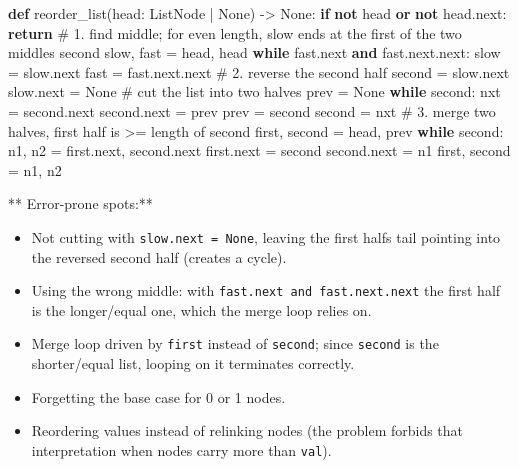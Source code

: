 \documentclass[11pt]{article}
\providecommand{\tightlist}{\setlength{\itemsep}{1pt}\setlength{\parskip}{0pt}}
\newenvironment{Shaded}{\begin{snugshade}}{\end{snugshade}}
\newcommand{\BuiltInTok}[1]{\textcolor[rgb]{0.50,0.55,0.55}{#1}}
\newcommand{\CommentTok}[1]{\textcolor[rgb]{0.48,0.49,0.49}{#1}}
\newcommand{\ControlFlowTok}[1]{\textcolor[rgb]{0.99,0.74,0.29}{\textbf{#1}}}
\newcommand{\KeywordTok}[1]{\textcolor[rgb]{0.81,0.81,0.76}{\textbf{#1}}}
\newcommand{\NormalTok}[1]{\textcolor[rgb]{0.81,0.81,0.76}{#1}}
\newcommand{\OperatorTok}[1]{\textcolor[rgb]{0.81,0.81,0.76}{#1}}
\newcommand{\VariableTok}[1]{\textcolor[rgb]{0.15,0.68,0.68}{#1}}
\begin{document}
\begin{Shaded}
\begin{Highlighting}[]
\KeywordTok{def}\NormalTok{ reorder\_list(head: ListNode }\OperatorTok{|} \VariableTok{None}\NormalTok{) }\OperatorTok{{-}\textgreater{}} \VariableTok{None}\NormalTok{:}
    \ControlFlowTok{if} \KeywordTok{not}\NormalTok{ head }\KeywordTok{or} \KeywordTok{not}\NormalTok{ head.}\BuiltInTok{next}\NormalTok{:}
        \ControlFlowTok{return}
    \CommentTok{\# 1. find middle; for even length, slow ends at the first of the two middles\textquotesingle{} second}
\NormalTok{    slow, fast }\OperatorTok{=}\NormalTok{ head, head}
    \ControlFlowTok{while}\NormalTok{ fast.}\BuiltInTok{next} \KeywordTok{and}\NormalTok{ fast.}\BuiltInTok{next}\NormalTok{.}\BuiltInTok{next}\NormalTok{:}
\NormalTok{        slow }\OperatorTok{=}\NormalTok{ slow.}\BuiltInTok{next}
\NormalTok{        fast }\OperatorTok{=}\NormalTok{ fast.}\BuiltInTok{next}\NormalTok{.}\BuiltInTok{next}
    \CommentTok{\# 2. reverse the second half}
\NormalTok{    second }\OperatorTok{=}\NormalTok{ slow.}\BuiltInTok{next}
\NormalTok{    slow.}\BuiltInTok{next} \OperatorTok{=} \VariableTok{None}          \CommentTok{\# cut the list into two halves}
\NormalTok{    prev }\OperatorTok{=} \VariableTok{None}
    \ControlFlowTok{while}\NormalTok{ second:}
\NormalTok{        nxt }\OperatorTok{=}\NormalTok{ second.}\BuiltInTok{next}
\NormalTok{        second.}\BuiltInTok{next} \OperatorTok{=}\NormalTok{ prev}
\NormalTok{        prev }\OperatorTok{=}\NormalTok{ second}
\NormalTok{        second }\OperatorTok{=}\NormalTok{ nxt}
    \CommentTok{\# 3. merge two halves, first half is \textgreater{}= length of second}
\NormalTok{    first, second }\OperatorTok{=}\NormalTok{ head, prev}
    \ControlFlowTok{while}\NormalTok{ second:}
\NormalTok{        n1, n2 }\OperatorTok{=}\NormalTok{ first.}\BuiltInTok{next}\NormalTok{, second.}\BuiltInTok{next}
\NormalTok{        first.}\BuiltInTok{next} \OperatorTok{=}\NormalTok{ second}
\NormalTok{        second.}\BuiltInTok{next} \OperatorTok{=}\NormalTok{ n1}
\NormalTok{        first, second }\OperatorTok{=}\NormalTok{ n1, n2}
\end{Highlighting}
\end{Shaded}

** Error-prone spots:**

\begin{itemize}
\tightlist
\item
  Not cutting with \texttt{slow.next\ =\ None}, leaving the first half\textquotesingle s tail pointing into the reversed second half (creates a cycle).
\item
  Using the wrong middle: with \texttt{fast.next\ and\ fast.next.next} the first half is the longer/equal one, which the merge loop relies on.
\item
  Merge loop driven by \texttt{first} instead of \texttt{second}; since \texttt{second} is the shorter/equal list, looping on it terminates correctly.
\item
  Forgetting the base case for 0 or 1 nodes.
\item
  Reordering values instead of relinking nodes (the problem forbids that interpretation when nodes carry more than \texttt{val}).
\end{itemize}
\end{document}
